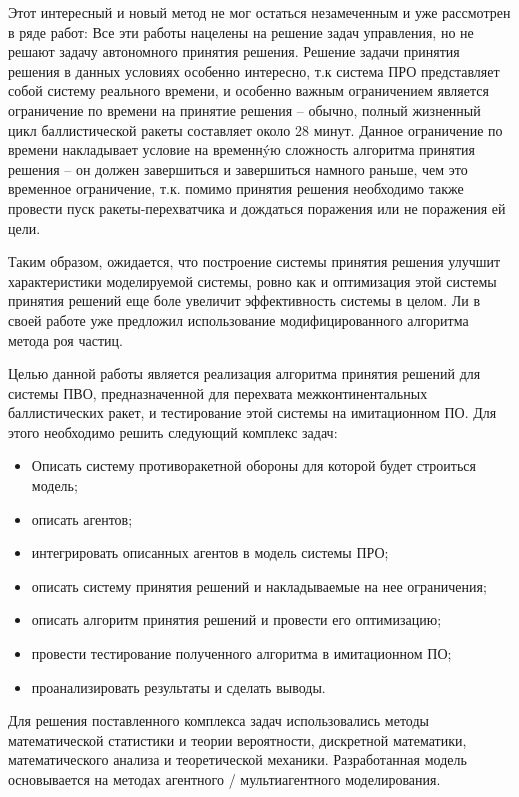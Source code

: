 Этот интересный и новый метод не мог остаться незамеченным и уже рассмотрен в ряде работ: 
Все эти работы нацелены на решение задач  управления, но не решают задачу автономного принятия решения. Решение задачи принятия решения в данных условиях особенно интересно, т.к система ПРО представляет собой систему реального времени, и особенно важным ограничением является ограничение по времени на принятие решения -- обычно, полный жизненный цикл баллистической ракеты составляет около 28 минут. Данное ограничение по времени накладывает условие на временн\'yю сложность алгоритма принятия решения -- он должен завершиться и завершиться намного раньше, чем это временное ограничение, т.к. помимо принятия решения необходимо также провести пуск ракеты-перехватчика и дождаться поражения или не поражения ей цели.

Таким образом, ожидается, что построение системы принятия решения улучшит характеристики моделируемой системы, ровно как и оптимизация этой системы принятия решений еще боле увеличит эффективность системы в целом. Ли %
в своей работе уже предложил использование модифицированного алгоритма метода роя частиц.

Целью данной работы является реализация алгоритма принятия решений для системы ПВО, предназначенной для перехвата межконтинентальных баллистических ракет, и тестирование этой системы на имитационном ПО. Для этого необходимо решить следующий комплекс задач:

\begin{itemize}
	\item Описать систему противоракетной обороны для которой будет строиться модель;
	\item описать агентов;
	\item интегрировать описанных агентов в модель системы ПРО;
	\item описать систему принятия решений и накладываемые на нее ограничения;
	\item описать алгоритм принятия решений и провести его оптимизацию;
	\item провести тестирование полученного алгоритма в имитационном ПО;
	\item проанализировать результаты и сделать выводы. 
\end{itemize}

Для решения поставленного комплекса задач использовались методы математической статистики и теории вероятности, дискретной математики, математического анализа и теоретической механики. Разработанная модель основывается на методах агентного / мультиагентного моделирования.

